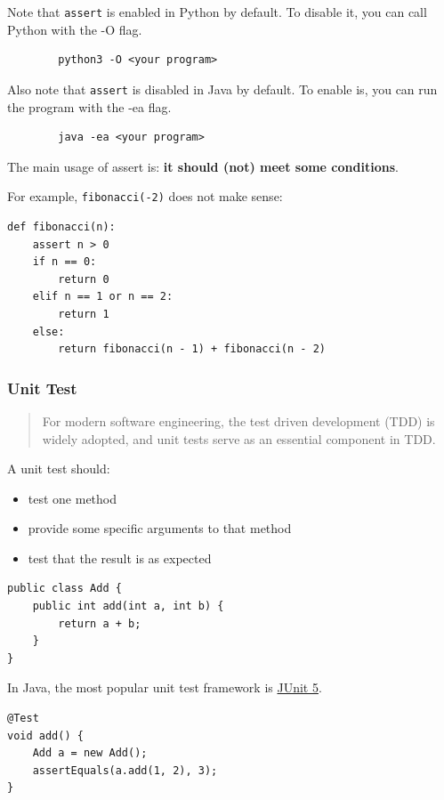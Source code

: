 \documentclass[aspectratio=169, 14pt]{beamer}
\begin{document}
\begin{frame}[fragile=singleslide]
    Note that \texttt{assert} is enabled in Python by default. To disable it, you can call Python with the \alert{-O} flag.

    \begin{verbatim}
        python3 -O <your program>
    \end{verbatim}

    Also note that \texttt{assert} is disabled in Java by default. To enable is, you can run the program with the \alert{-ea} flag.

    \begin{verbatim}
        java -ea <your program>
    \end{verbatim} 
\end{frame}

\begin{frame}[fragile]
The main usage of \alert{assert} is: \textbf{it should (not) meet some conditions}.

For example, \texttt{fibonacci(-2)} does not make sense:

\begin{verbatim}
def fibonacci(n):
    assert n > 0
    if n == 0:
        return 0
    elif n == 1 or n == 2:
        return 1
    else:
        return fibonacci(n - 1) + fibonacci(n - 2) 
\end{verbatim}  

\end{frame}

\begin{frame}
    \frametitle{Unit Test}
\begin{quote}
    For modern software engineering, the test driven development (TDD) is widely adopted, and \alert{unit tests} serve as an essential component in TDD. 
\end{quote}

A unit test should:
\begin{itemize}
    \item test one method
    \item provide some specific arguments to that method
    \item test that the result is as expected
\end{itemize}
\end{frame}

\begin{frame}[fragile]

    \begin{verbatim}
public class Add {
    public int add(int a, int b) {
        return a + b;
    }
}
    \end{verbatim}  
In Java, the most popular unit test framework is \href{https://junit.org/junit5/}{JUnit 5}.

\begin{verbatim}
@Test
void add() {
    Add a = new Add();
    assertEquals(a.add(1, 2), 3);
}    
\end{verbatim}

\end{frame}
\end{document}
